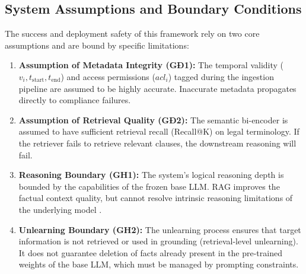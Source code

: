 \subsection{System Assumptions and Boundary Conditions}
The success and deployment safety of this framework rely on two core assumptions and are bound by specific limitations:
\begin{enumerate}
    \item \textbf{Assumption of Metadata Integrity (GĐ1):} The temporal validity ($v_i, t_{\text{start}}, t_{\text{end}}$) and access permissions ($acl_i$) tagged during the ingestion pipeline are assumed to be highly accurate. Inaccurate metadata propagates directly to compliance failures.
    \item \textbf{Assumption of Retrieval Quality (GĐ2):} The semantic bi-encoder is assumed to have sufficient retrieval recall (Recall@K) on legal terminology. If the retriever fails to retrieve relevant clauses, the downstream reasoning will fail.
    \item \textbf{Reasoning Boundary (GH1):} The system's logical reasoning depth is bounded by the capabilities of the frozen base LLM. RAG improves the factual context quality, but cannot resolve intrinsic reasoning limitations of the underlying model \parencite{le-etal-2025-overview}.
    \item \textbf{Unlearning Boundary (GH2):} The unlearning process ensures that target information is not retrieved or used in grounding (retrieval-level unlearning). It does not guarantee deletion of facts already present in the pre-trained weights of the base LLM, which must be managed by prompting constraints.
\end{enumerate}

